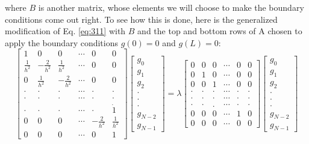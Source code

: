 where $B$ is another matrix, whose elements we will choose to make the boundary
conditions come out right. To see how this is done, here is the generalized modification of Eq. \ref{eq:311} with $B$ and the top and bottom rows of A chosen to apply the boundary conditions
$g (0) = 0$ and $g(L)= 0$:
\begin{equation}
\left[\begin{array}{cccccc}
1 & 0 & 0 & \cdots & 0 & 0 \\
\frac{1}{h^{2}} & -\frac{2}{h^{2}} & \frac{1}{h^{2}} & \cdots & 0 & 0 \\
0 & \frac{1}{h^{2}} & -\frac{2}{h^{2}} & \cdots & 0 & 0 \\
\cdot & \cdot & \cdot & \cdots & \cdot & \cdot \\
\cdot & \cdot & \cdot & \cdots & \cdot & \cdot \\
\cdot & \cdot & \cdot & \cdots & \cdot & \dot{1} \\
0 & 0 & 0 & \cdots & -\frac{2}{h^{2}} & \frac{1}{h^{2}} \\
0 & 0 & 0 & \cdots & 0 & 1
\end{array}\right]\left[\begin{array}{c}
g_{0} \\
g_{1} \\
g_{2} \\
\cdot \\
\cdot \\
\cdot \\
g_{N-2} \\
g_{N-1}
\end{array}\right] = \lambda
\left[\begin{array}{cccccc}
0 & 0 & 0 & \cdots & 0 & 0 \\
0 & 1 & 0 & \cdots & 0 & 0 \\
0 & 0 & 1 & \cdots & 0 & 0 \\
\cdot & \cdot & \cdot & \cdots & \cdot & \cdot \\
\cdot & \cdot & \cdot & \cdots & \cdot & \cdot \\
\cdot & \cdot & . & \cdots & \cdot & \cdot \\
0 & 0 & 0 & \cdots & 1 & 0 \\
0 & 0 & 0 & \cdots & 0 & 0
\end{array}\right]\left[\begin{array}{r}
g_{0} \\
g_{1} \\
g_{2} \\
\cdot \\
\cdot \\
\cdot \\
g_{N-2} \\
g_{N-1}
\end{array}\right]
\end{equation}
